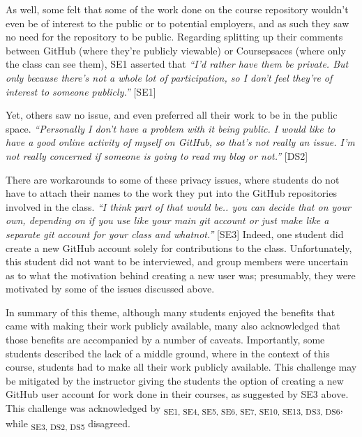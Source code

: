 As well, some felt that some of the work done on the course repository wouldn't even be of interest to the public or to potential employers, and as such they saw no need for the repository to be public. Regarding splitting up their comments between GitHub (where they're publicly viewable) or Coursepsaces (where only the class can see them), SE1 asserted that \textit{``I'd rather have them be private. But only because there's not a whole lot of participation, so I don't feel they're of interest to someone publicly.''} [SE1]


Yet, others saw no issue, and even preferred all their work to be in the public space. \textit{``Personally I don't have a problem with it being public. I would like to have a good online activity of myself on GitHub, so that's not really an issue. I'm not really concerned if someone is going to read my blog or not.''} [DS2]

There are workarounds to some of these privacy issues, where students do not have to attach their names to the work they put into the GitHub repositories involved in the class. \textit{``I think part of that would be.. you can decide that on your own, depending on if you use like your main git account or just make like a separate git account for your class and whatnot.''} [SE3] Indeed, one student did create a new GitHub account solely for contributions to the class. Unfortunately, this student did not want to be interviewed, and group members were uncertain as to what the motivation behind creating a new user was; presumably, they were motivated by some of the issues discussed above.

In summary of this theme, although many students enjoyed the benefits that came with making their work publicly available, many also acknowledged that those benefits are accompanied by a number of caveats. Importantly, some students described the lack of a middle ground, where in the context of this course, students had to make all their work publicly available. This challenge may be mitigated by the instructor giving the students the option of creating a new GitHub user account for work done in their courses, as suggested by SE3 above. This challenge was acknowledged by \textsubscript{SE1, SE4, SE5, SE6, SE7, SE10, SE13, DS3, DS6}, while \textsubscript{SE3, DS2, DS5} disagreed. \\

